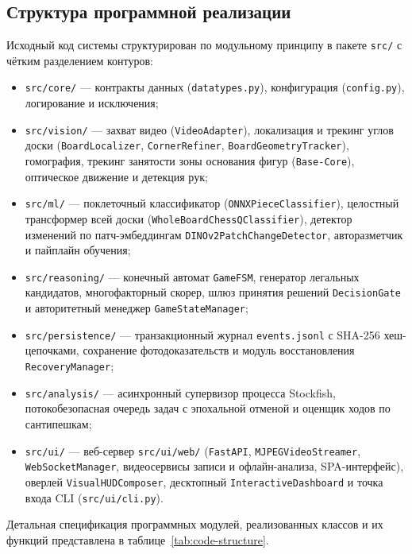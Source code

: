 \subsection{Структура программной реализации}

Исходный код системы структурирован по модульному принципу в пакете \texttt{src/} с чётким разделением контуров:

\begin{itemize}
    \item \texttt{src/core/} --- контракты данных (\texttt{datatypes.py}), конфигурация (\texttt{config.py}), логирование и исключения;
    \item \texttt{src/vision/} --- захват видео (\texttt{VideoAdapter}), локализация и трекинг углов доски (\texttt{BoardLocalizer}, \texttt{CornerRefiner}, \texttt{BoardGeometryTracker}), гомография, трекинг занятости зоны основания фигур (\texttt{Base-Core}), оптическое движение и детекция рук;
    \item \texttt{src/ml/} --- поклеточный классификатор (\texttt{ONNXPieceClassifier}), целостный трансформер всей доски (\texttt{WholeBoardChessQClassifier}), детектор изменений по патч-эмбеддингам \texttt{DINOv2PatchChangeDetector}, авторазметчик и пайплайн обучения;
    \item \texttt{src/reasoning/} --- конечный автомат \texttt{GameFSM}, генератор легальных кандидатов, многофакторный скорер, шлюз принятия решений \texttt{DecisionGate} и авторитетный менеджер \texttt{GameStateManager};
    \item \texttt{src/persistence/} --- транзакционный журнал \texttt{events.jsonl} с SHA-256 хеш-цепочками, сохранение фотодоказательств и модуль восстановления \texttt{RecoveryManager};
    \item \texttt{src/analysis/} --- асинхронный супервизор процесса Stockfish, потокобезопасная очередь задач с эпохальной отменой и оценщик ходов по сантипешкам;
    \item \texttt{src/ui/} --- веб-сервер \texttt{src/ui/web/} (\texttt{FastAPI}, \texttt{MJPEGVideoStreamer}, \texttt{WebSocketManager}, видеосервисы записи и офлайн-анализа, SPA-интерфейс), оверлей \texttt{VisualHUDComposer}, десктопный \texttt{InteractiveDashboard} и точка входа CLI (\texttt{src/ui/cli.py}).
\end{itemize}

Детальная спецификация программных модулей, реализованных классов и их функций представлена в таблице~\ref{tab:code-structure}.

